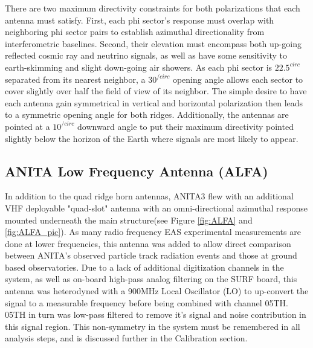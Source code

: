 		There are two maximum directivity constraints for both polarizations that each antenna must satisfy.  First, each phi sector's response must overlap with neighboring phi sector pairs to establish azimuthal directionality from interferometric baselines. Second, their elevation must encompass both up-going reflected cosmic ray and neutrino signals, as well as have some sensitivity to earth-skimming and slight down-going air showers.  As each phi sector is $22.5^{circ}$ separated from its nearest neighbor, a $30^{/circ}$ opening angle allows each sector to cover slightly over half the field of view of its neighbor.  The simple desire to have each antenna gain symmetrical in vertical and horizontal polarization then leads to a symmetric opening angle for both ridges.   Additionally, the antennas are pointed at a $10^{/circ}$ downward angle to put their maximum directivity pointed slightly below the horizon of the Earth where signals are most likely to appear.  
	
	\subsection{ANITA Low Frequency Antenna (ALFA)}
		In addition to the quad ridge horn antennas, ANITA3 flew with an additional VHF deployable "quad-slot" antenna with an omni-directional azimuthal response mounted underneath the main structure(see Figure \ref{fig:ALFA} and \ref{fig:ALFA_pic}).  As many radio frequency EAS experimental measurements are done at lower frequencies, this antenna was added to allow direct comparison between ANITA's observed particle track radiation events and those at ground based observatories.  Due to a lack of additional digitization channels in the system, as well as on-board high-pass analog filtering on the SURF board, this antenna was heterodyned with a 900MHz Local Oscillator (LO) to up-convert the signal to a measurable frequency before being combined with channel 05TH.  05TH in turn was low-pass filtered to remove it's signal and noise contribution in this signal region.  This non-symmetry in the system must be remembered in all analysis steps, and is discussed further in the Calibration section.
		
